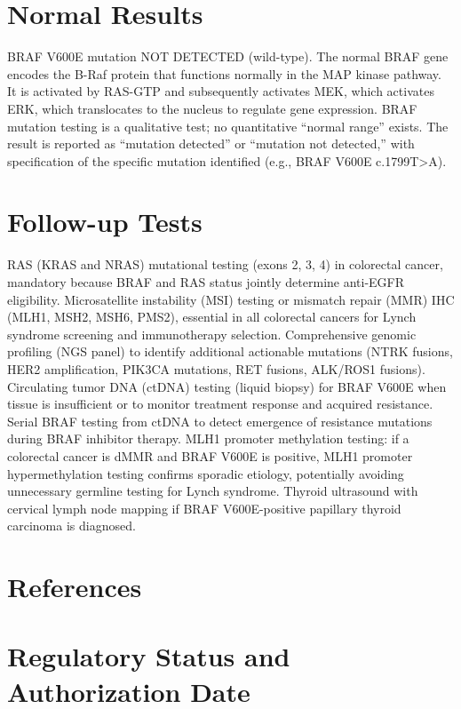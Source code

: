 \section*{Normal Results}
BRAF V600E mutation NOT DETECTED (wild-type). The normal BRAF gene encodes the B-Raf protein that functions normally in the MAP kinase pathway. It is activated by RAS-GTP and subsequently activates MEK, which activates ERK, which translocates to the nucleus to regulate gene expression. BRAF mutation testing is a qualitative test; no quantitative ``normal range'' exists. The result is reported as ``mutation detected'' or ``mutation not detected,'' with specification of the specific mutation identified (e.g., BRAF V600E c.1799T>A).

\section*{Follow-up Tests}
RAS (KRAS and NRAS) mutational testing (exons 2, 3, 4) in colorectal cancer, mandatory because BRAF and RAS status jointly determine anti-EGFR eligibility. Microsatellite instability (MSI) testing or mismatch repair (MMR) IHC (MLH1, MSH2, MSH6, PMS2), essential in all colorectal cancers for Lynch syndrome screening and immunotherapy selection. Comprehensive genomic profiling (NGS panel) to identify additional actionable mutations (NTRK fusions, HER2 amplification, PIK3CA mutations, RET fusions, ALK/ROS1 fusions). Circulating tumor DNA (ctDNA) testing (liquid biopsy) for BRAF V600E when tissue is insufficient or to monitor treatment response and acquired resistance. Serial BRAF testing from ctDNA to detect emergence of resistance mutations during BRAF inhibitor therapy. MLH1 promoter methylation testing: if a colorectal cancer is dMMR and BRAF V600E is positive, MLH1 promoter hypermethylation testing confirms sporadic etiology, potentially avoiding unnecessary germline testing for Lynch syndrome. Thyroid ultrasound with cervical lymph node mapping if BRAF V600E-positive papillary thyroid carcinoma is diagnosed.

\section*{References}


\clearpage
\section*{Regulatory Status and Authorization Date}

\clearpage
